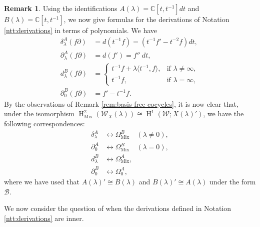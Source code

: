 \documentclass[11pt, svgnames]{amsart}
\newcommand{\CC}{\mathbb{C}}
\newcommand{\W}{\mathcal{W}}
\newcommand{\del}{\partial}
\DeclareMathOperator{\HH}{H}
\DeclareMathOperator{\Mix}{Mix}
\newcommand{\ang}[1]{\langle #1 \rangle}
\theoremstyle{definition}
\newtheorem{remark}[proposition]{Remark}
\begin{document}
\begin{remark}\label{rem:cocycle to derivation dictionary}
    Using the identifications $A(\lambda) = \CC[t,t^{-1}]dt$ and $B(\lambda) = \CC[t,t^{-1}]$, we now give formulas for the derivations of Notation \ref{ntt:derivations} in terms of polynomials. We have
    \begin{align*}
        \delta_\lambda^A(f\del) &= d(t^{-1}f) = (t^{-1}f' - t^{-2}f) dt, \\
        \del_\lambda^A(f\del) &= d(f') = f'' \ dt, \\
        d_\lambda^B(f\del) &= \begin{cases}
            t^{-1}f + \lambda \ang{t^{-1},f}, &\text{if } \lambda \neq \infty, \\
            t^{-1}f, &\text{if } \lambda = \infty,
        \end{cases} \\
        \del_0^B(f\del) &= f' - t^{-1}f.
    \end{align*}
    By the observations of Remark \ref{rem:basis-free cocycles}, it is now clear that, under the isomorphism $\HH^2_{\Mix}(\W_X(\lambda)) \cong \HH^1(\W;X(\lambda)')$, we have the following correspondences:
    \begin{align*}
        \delta_\lambda^A &\leftrightarrow \Omega^B_{\Mix} \quad (\lambda \neq 0), \\
        \del_0^A &\leftrightarrow \Omega^B_{\Mix} \quad (\lambda = 0), \\
        d_\lambda^B &\leftrightarrow \Omega^A_{\Mix}, \\
        \del_0^B &\leftrightarrow \Omega^A_0,
    \end{align*}
    where we have used that $A(\lambda)' \cong B(\lambda)$ and $B(\lambda)' \cong A(\lambda)$ under the form $\mathcal{B}$.
\end{remark}

We now consider the question of when the derivations defined in Notation \ref{ntt:derivations} are inner.
\end{document}
